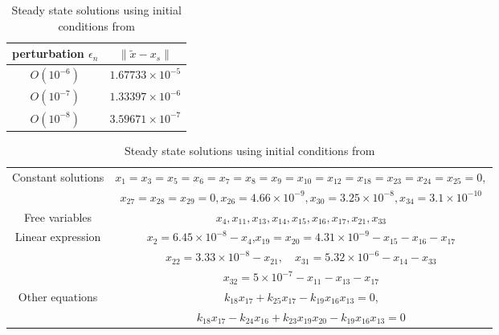 \begin{table}
\begin{center}

 \caption{Nonlinear stability of the steady state solution shown in Table \ref{steady2}}\vspace{3mm}\label{sta}
\begin{tabular}{|c|c|}\hline
perturbation $\epsilon_n$& $\|\tilde{x}-x_s\|$\\\hline
$O(10^{-6})$&$1.67733\times10^{-5}$\\\hline
$O(10^{-7})$&$1.33397\times10^{-6}$\\\hline
$O(10^{-8})$&$3.59671\times10^{-7}$\\\hline
\end{tabular}

\caption{Steady state solutions using initial conditions from
\cite{KF01}} \label{steady21}\vspace{3mm}
\begin{tabular}{|c|c|}\hline
Constant solutions &$x_1=x_3=x_5=x_6=x_7=x_8=x_9=x_{10}=x_{12}=x_{18}=x_{23}=x_{24}=x_{25}=0,$\\
 & $x_{27}=x_{28}=x_{29}=0,x_{26}=4.66\times10^{-9},x_{30}=3.25\times 10^{-8},x_{34}=3.1\times 10^{-10}$\\\hline
Free variables &$x_4,  x_{11},x_{13}, x_{14},x_{15},x_{16}, x_{17},
x_{21},x_{33}$\\\hline Linear
expression&$x_{2}=6.45\times10^{-8}-x_{4}$,\quad  $x_{19}=x_{20}=4.31\times10^{-9}-x_{15}-x_{16}-x_{17}$\\
&$ x_{22}=3.33\times10^{-8}-x_{21},\quad x_{31}=5.32\times10^{-6}-x_{14}-x_{33}$\\
&$ x_{32}=5\times10^{-7}-x_{11}-x_{13}-x_{17}$\\\hline Other
equations&$k_{18}x_{17}+k_{25}x_{17}-k_{19}x_{16}x_{13}=0$,\\&$k_{18}x_{17}-k_{24}x_{16}+k_{23}x_{19}x_{20}-k_{19}x_{16}x_{13}=0$\\\hline
\end{tabular}


\end{center}
\end{table}
